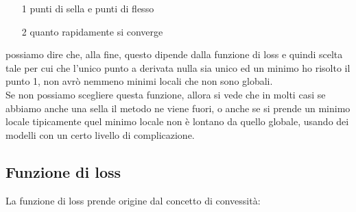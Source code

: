 \documentclass[12pt, oneside]{extbook}
\begin{document}
\begin{itemize}
	\item[1] punti di sella e punti di flesso
	\item[2] quanto rapidamente si converge
\end{itemize}
possiamo dire che, alla fine, questo dipende dalla funzione di loss e quindi scelta tale per cui che l'unico punto a derivata nulla sia unico ed un minimo ho risolto il punto 1, non avrò nemmeno minimi locali che non sono globali.\\Se non possiamo scegliere questa funzione, allora si vede che in molti casi se abbiamo anche una sella il metodo ne viene fuori, o anche se si prende un minimo locale tipicamente quel minimo locale non è lontano da quello globale, usando dei modelli con un certo livello di complicazione.

\subsection{Funzione di loss}
La funzione di loss prende origine dal concetto di convessità:\\
\end{document}
